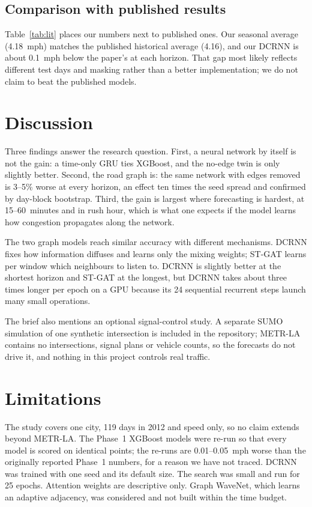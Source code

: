\documentclass[conference]{IEEEtran}
\begin{document}
\subsection{Comparison with published results}
Table~\ref{tab:lit} places our numbers next to published ones. Our seasonal average (4.18~mph) matches the published historical average (4.16), and our DCRNN is about 0.1~mph below the paper's at each horizon. That gap most likely reflects different test days and masking rather than a better implementation; we do not claim to beat the published models.



\section{Discussion}
Three findings answer the research question. First, a neural network by itself is not the gain: a time-only GRU ties XGBoost, and the no-edge twin is only slightly better. Second, the road graph is: the same network with edges removed is 3--5\% worse at every horizon, an effect ten times the seed spread and confirmed by day-block bootstrap. Third, the gain is largest where forecasting is hardest, at 15--60~minutes and in rush hour, which is what one expects if the model learns how congestion propagates along the network.

The two graph models reach similar accuracy with different mechanisms. DCRNN fixes how information diffuses and learns only the mixing weights; ST-GAT learns per window which neighbours to listen to. DCRNN is slightly better at the shortest horizon and ST-GAT at the longest, but DCRNN takes about three times longer per epoch on a GPU because its 24 sequential recurrent steps launch many small operations.

The brief also mentions an optional signal-control study. A separate SUMO simulation of one synthetic intersection is included in the repository; METR-LA contains no intersections, signal plans or vehicle counts, so the forecasts do not drive it, and nothing in this project controls real traffic.

\section{Limitations}
The study covers one city, 119 days in 2012 and speed only, so no claim extends beyond METR-LA. The Phase~1 XGBoost models were re-run so that every model is scored on identical points; the re-runs are 0.01--0.05~mph worse than the originally reported Phase~1 numbers, for a reason we have not traced. DCRNN was trained with one seed and its default size. The search was small and run for 25 epochs. Attention weights are descriptive only. Graph WaveNet, which learns an adaptive adjacency, was considered and not built within the time budget.
\end{document}
